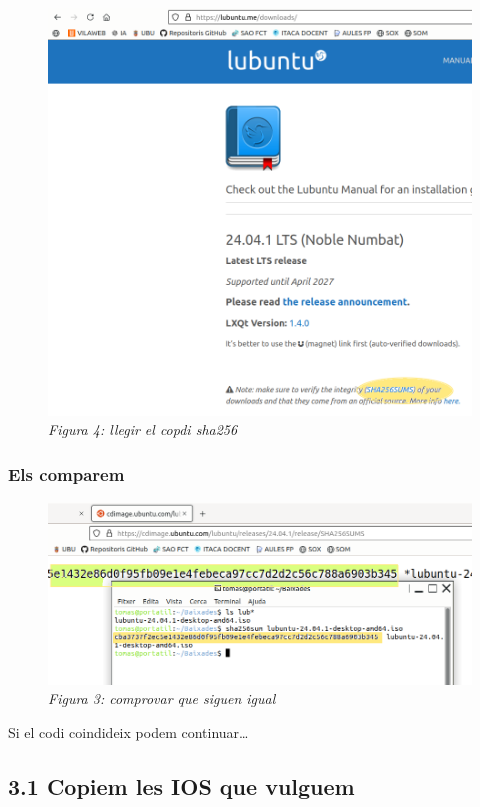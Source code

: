 \documentclass[
  a4paper,
]{article}
\begin{document}
\begin{figure}
\centering
\includegraphics{png/sha256sum2.png}
\caption{\emph{Figura 4: llegir el copdi sha256}}
\end{figure}

\subsubsection{Els comparem}\label{els-comparem}

\begin{figure}
\centering
\includegraphics{png/sha256sum3.png}
\caption{\emph{Figura 3: comprovar que siguen igual}}
\end{figure}

Si el codi coindideix podem continuar\ldots{}

\subsection{3.1 Copiem les IOS que
vulguem}\label{copiem-les-ios-que-vulguem}
\end{document}
